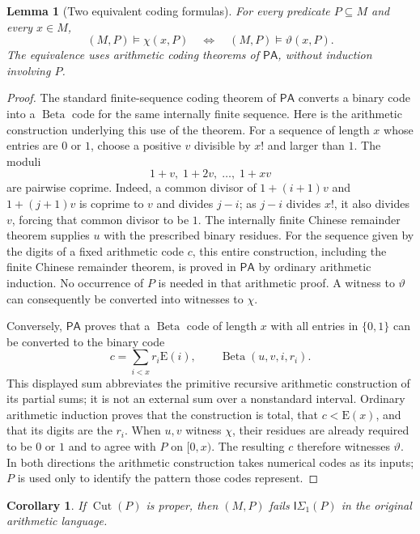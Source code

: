 \documentclass[11pt]{article}
\numberwithin{equation}{section}
\newtheorem{lemma}[theorem]{Lemma}
\newtheorem{corollary}[theorem]{Corollary}
\theoremstyle{definition}
\theoremstyle{remark}
\newcommand{\PA}{\mathsf{PA}}
\newcommand{\E}{\mathrm E}
\newcommand{\Cut}{\operatorname{Cut}}
\begin{document}
\begin{lemma}[Two equivalent coding formulas]
\label{rbc:lem:induction-coding-equivalence}
For every predicate $P\subseteq M$ and every $x\in M$,
\[
 (M,P)\models\chi(x,P)
 \quad\Longleftrightarrow\quad
 (M,P)\models\vartheta(x,P).
\]
The equivalence uses arithmetic coding theorems of $\PA$, without
induction involving $P$.
\end{lemma}

\begin{proof}
The standard finite-sequence coding theorem of $\PA$ converts a binary
code into a $\operatorname{Beta}$ code for the same internally finite
sequence.  Here is the arithmetic construction underlying this use of
the theorem.  For a sequence of length $x$ whose entries are $0$ or $1$,
choose a positive $v$ divisible by $x!$ and larger than $1$.  The moduli
\[
  1+v,\;1+2v,\;\ldots,\;1+xv
\]
are pairwise coprime.  Indeed, a common divisor of
$1+(i+1)v$ and $1+(j+1)v$ is coprime to $v$ and divides $j-i$;
as $j-i$ divides $x!$, it also divides $v$, forcing that common divisor
to be $1$.  The internally finite Chinese remainder theorem supplies
$u$ with the prescribed binary residues.  For the sequence given by
the digits of a fixed arithmetic code $c$, this entire construction,
including the finite Chinese remainder theorem, is proved in $\PA$
by ordinary arithmetic induction.  No occurrence of $P$ is needed in
that arithmetic proof.  A witness to $\vartheta$ can consequently be
converted into witnesses to $\chi$.

Conversely, $\PA$ proves that a $\operatorname{Beta}$ code of length
$x$ with all entries in $\{0,1\}$ can be converted to the binary code
\[
   c=\sum_{i<x} r_i\E(i),
   \qquad
   \operatorname{Beta}(u,v,i,r_i).
\]
This displayed sum abbreviates the primitive recursive arithmetic
construction of its partial sums; it is not an external sum over a
nonstandard interval.  Ordinary arithmetic induction proves that the
construction is total, that $c<\E(x)$, and that its digits are the
$r_i$.  When $u,v$ witness $\chi$, their residues are already required
to be $0$ or $1$ and to agree with $P$ on $[0,x)$.  The resulting $c$
therefore witnesses $\vartheta$.  In both directions the arithmetic
construction takes numerical codes as its inputs; $P$ is used only to
identify the pattern those codes represent.
\end{proof}

\begin{corollary}
\label{rbc:cor:induction-sigma-obstruction}
If $\Cut(P)$ is proper, then $(M,P)$ fails
$\mathsf{I}\Sigma_1(P)$ in the original arithmetic language.
\end{corollary}
\end{document}
